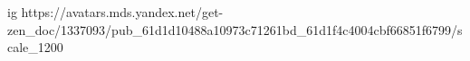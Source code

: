  
 
 
 
 

\ifcmt
  ig https://avatars.mds.yandex.net/get-zen_doc/1337093/pub_61d1d10488a10973c71261bd_61d1f4c4004cbf66851f6799/scale_1200
\fi
